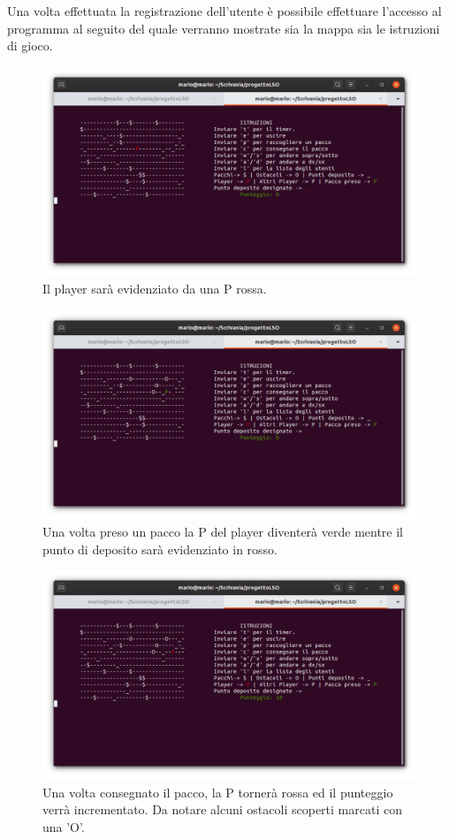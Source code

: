 \documentclass[a4paper]{article}
\begin{document}
Una volta effettuata la registrazione dell'utente è possibile effettuare l'accesso al programma al seguito del quale 
verranno mostrate sia la mappa sia le istruzioni di gioco.\\
\begin{figure}[H]
  \includegraphics[width=\textwidth]{clientInizio}
  \caption{Il player sarà evidenziato da una P rossa.}
\end{figure}\begin{figure}[H]
  \includegraphics[width=\textwidth]{clientPacco}
  \caption{Una volta preso un pacco la P del player diventerà verde mentre il punto di deposito sarà evidenziato in rosso.}
\end{figure}\begin{figure}[H]
  \includegraphics[width=\textwidth]{clientConsegnato}
  \caption{Una volta consegnato il pacco, la P tornerà rossa ed il punteggio verrà incrementato. Da notare alcuni ostacoli scoperti marcati con una 'O'.}
\end{figure}
\end{document}
